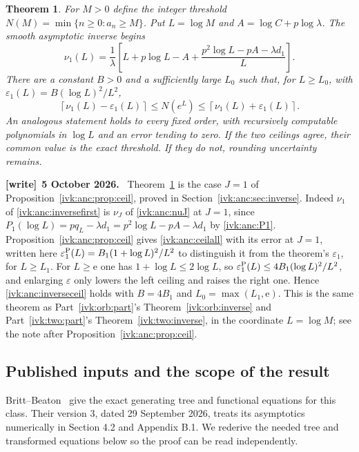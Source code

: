 \documentclass[11pt,letterpaper]{article}
\newtheorem{theorem}{Theorem}[section]
\theoremstyle{remark}\newtheorem{remark}[theorem]{Remark}
\newcommand{\eps}{\varepsilon}
\newcommand{\ceil}[1]{\left\lceil#1\right\rceil}
\newenvironment{writenote}[1][]{\par\smallskip\begingroup\small
 \noindent\textbf{[write]}\if\relax\detokenize{#1}\relax\else~\textbf{#1.}\fi\ }%
 {\par\endgroup\smallskip}
\begin{document}
\begin{theorem}\label{ivk:anc:thm:inverse}
For $M>0$ define the integer threshold
$N(M)=\min\{n\ge0:a_n\ge M\}$. Put $L=\log M$ and
$A=\log C+p\log\lambda$. The smooth asymptotic inverse begins
\begin{equation}\label{ivk:anc:inversefirst}
 \nu_1(L)=\frac1\lambda\left[
 L+p\log L-A+
 \frac{p^2\log L-pA-\lambda d_1}{L}\right].
\end{equation}
There are a constant $B>0$ and a sufficiently large $L_0$ such that,
for $L\ge L_0$, with $\eps_1(L)=B(\log L)^2/L^2$,
\begin{equation}\label{ivk:anc:inverseceil}
 \ceil{\nu_1(L)-\eps_1(L)}\le N(e^L)
                         \le\ceil{\nu_1(L)+\eps_1(L)}.
\end{equation}
An analogous statement holds to every fixed order, with recursively
computable polynomials in $\log L$ and an error tending to zero.
If the two ceilings agree, their common value is the exact threshold.
If they do not, rounding uncertainty remains.
\end{theorem}
\begin{writenote}[5 October 2026]
Theorem~\ref{ivk:anc:thm:inverse} is the case $J=1$ of Proposition~\ref{ivk:anc:prop:ceil}, proved in Section~\ref{ivk:anc:sec:inverse}. Indeed $\nu_1$ of \eqref{ivk:anc:inversefirst} is $\nu_J$ of \eqref{ivk:anc:nuJ} at $J=1$, since $P_1(\log L)=pq_L-\lambda d_1=p^2\log L-pA-\lambda d_1$ by \eqref{ivk:anc:P1}. Proposition~\ref{ivk:anc:prop:ceil} gives \eqref{ivk:anc:ceilall} with its error at $J=1$, written here $\eps_1^{\rm P}(L)=B_1(1+\log L)^2/L^2$ to distinguish it from the theorem's $\eps_1$, for $L\ge L_1$. For $L\ge\mathrm e$ one has $1+\log L\le2\log L$, so $\eps_1^{\rm P}(L)\le4B_1(\log L)^2/L^2$, and enlarging $\eps$ only lowers the left ceiling and raises the right one. Hence \eqref{ivk:anc:inverseceil} holds with $B=4B_1$ and $L_0=\max(L_1,\mathrm e)$. This is the same theorem as Part~\ref{ivk:orb:part}'s Theorem~\ref{ivk:orb:inverse} and Part~\ref{ivk:two:part}'s Theorem~\ref{ivk:two:inverse}, in the coordinate $L=\log M$; see the note after Proposition~\ref{ivk:anc:prop:ceil}.
\end{writenote}


\subsection{Published inputs and the scope of the result}
Britt--Beaton~\cite[Section 2.4, equations (2.40)--(2.43)]{bb} give the
exact generating tree and functional equations for this class. Their
version 3, dated 29 September 2026, treats its asymptotics numerically
in Section 4.2 and Appendix B.1. We rederive the needed tree and
transformed equations below so the proof can be read independently.
\end{document}
